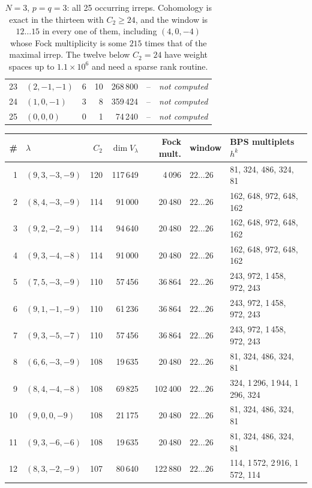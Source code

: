 \documentclass[10pt]{article}
\begin{document}
\begin{table}[p]
\begin{tabular}{rlrrrll}
23 & $(2,-1,-1)$ & 6 & 10 & 268\,800 & -- & \emph{not computed}\\
24 & $(1,0,-1)$ & 3 & 8 & 359\,424 & -- & \emph{not computed}\\
25 & $(0,0,0)$ & 0 & 1 & 74\,240 & -- & \emph{not computed}\\
\bottomrule\end{tabular}
\caption{$N=3$, $p=q=3$: all 25 occurring irreps. Cohomology is exact in the thirteen with $C_2\ge24$, and the window is $12\ldots15$ in every one of them, including $(4,0,-4)$ whose Fock multiplicity is some $215$ times that of the maximal irrep. The twelve below $C_2=24$ have weight spaces up to $1.1\times10^6$ and need a sparse rank routine.}\label{tab:app3}
\end{table}

\begin{table}[p]\centering\small
\begin{tabular}{rlrrrll}
\toprule
\# & $\lambda$ & $C_2$ & $\dim V_\lambda$ & Fock mult. & window & BPS multiplets $h^k$\\
\midrule
1 & $(9,3,-3,-9)$ & 120 & 117\,649 & 4\,096 & $22\ldots26$ & 81, 324, 486, 324, 81\\
2 & $(8,4,-3,-9)$ & 114 & 91\,000 & 20\,480 & $22\ldots26$ & 162, 648, 972, 648, 162\\
3 & $(9,2,-2,-9)$ & 114 & 94\,640 & 20\,480 & $22\ldots26$ & 162, 648, 972, 648, 162\\
4 & $(9,3,-4,-8)$ & 114 & 91\,000 & 20\,480 & $22\ldots26$ & 162, 648, 972, 648, 162\\
5 & $(7,5,-3,-9)$ & 110 & 57\,456 & 36\,864 & $22\ldots26$ & 243, 972, 1\,458, 972, 243\\
6 & $(9,1,-1,-9)$ & 110 & 61\,236 & 36\,864 & $22\ldots26$ & 243, 972, 1\,458, 972, 243\\
7 & $(9,3,-5,-7)$ & 110 & 57\,456 & 36\,864 & $22\ldots26$ & 243, 972, 1\,458, 972, 243\\
8 & $(6,6,-3,-9)$ & 108 & 19\,635 & 20\,480 & $22\ldots26$ & 81, 324, 486, 324, 81\\
9 & $(8,4,-4,-8)$ & 108 & 69\,825 & 102\,400 & $22\ldots26$ & 324, 1\,296, 1\,944, 1\,296, 324\\
10 & $(9,0,0,-9)$ & 108 & 21\,175 & 20\,480 & $22\ldots26$ & 81, 324, 486, 324, 81\\
11 & $(9,3,-6,-6)$ & 108 & 19\,635 & 20\,480 & $22\ldots26$ & 81, 324, 486, 324, 81\\
12 & $(8,3,-2,-9)$ & 107 & 80\,640 & 122\,880 & $22\ldots26$ & 114, 1\,572, 2\,916, 1\,572, 114\\

\end{tabular}
\end{table}
\end{document}
